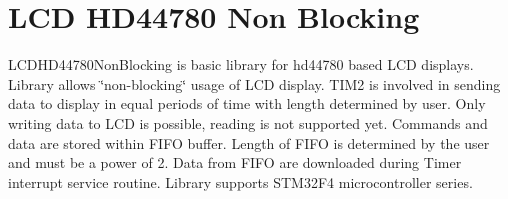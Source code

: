 \hypertarget{group___l_c_d_h_d44780_non_blocking}{}\section{L\+CD H\+D44780 Non Blocking}
\label{group___l_c_d_h_d44780_non_blocking}


L\+C\+D\+H\+D44780\+Non\+Blocking is basic library for hd44780 based L\+CD displays. Library allows \char`\"{}non-\/blocking\char`\"{} usage of L\+CD display. T\+I\+M2 is involved in sending data to display in equal periods of time with length determined by user. Only writing data to L\+CD is possible, reading is not supported yet. Commands and data are stored within F\+I\+FO buffer. Length of F\+I\+FO is determined by the user and must be a power of 2. Data from F\+I\+FO are downloaded during Timer interrupt service routine. Library supports S\+T\+M32\+F4 microcontroller series.  


